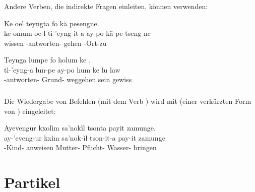 \subsubsection{} Andere Verben, die indirekte Fragen einleiten, können  verwenden:

\begin{interlin}
	\glll \Npawl{}Ke  oel teyngta fo kä pesengne. \\
	ke omum oe-l tì-'eyng-it-a ay-po kä pe-tseng-ne \\
	 wissen  -antworten-  gehen -Ort-zu \\
\end{interlin}

\begin{interlin}
	\glll \Npawl{}Teynga lumpe fo holum ke  . \\
	tì-'eyng-a lun-pe ay-po hum ke lu law \\
	-antworten- Grund-  weggehen  sein gewiss \\
\end{interlin}
\label{syn:quot:indirect_questions}

\subsubsection{} Die Wiedergabe von Befehlen (mit dem Verb ) wird mit  (einer verkürzten Form von  ) eingeleitet:

\begin{interlin}
	\glll \Npawl{}Ayevengur kxolìm sa'nokìl tsonta payit zamunge. \\
	ay-'eveng-ur kxìm sa'nok-ìl tson-it-a pay-it zamunge \\
	-Kind- anweisen Mutter- Pflicht- Wasser- bringen \\
\end{interlin}
\noindent{}

\section{Partikel}

